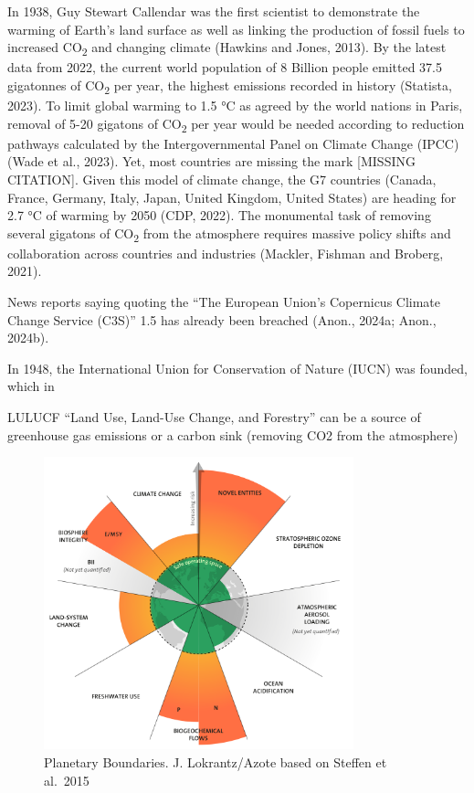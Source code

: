 \documentclass[
  letterpaper,
  DIV=11,
  numbers=noendperiod]{scrartcl}
\begin{document}
In 1938, Guy Stewart Callendar was the first scientist to demonstrate
the warming of Earth's land surface as well as linking the production of
fossil fuels to increased CO\textsubscript{2} and changing climate
(Hawkins and Jones, 2013). By the latest data from 2022, the current
world population of 8 Billion people emitted 37.5 gigatonnes of
CO\textsubscript{2} per year, the highest emissions recorded in history
(Statista, 2023). To limit global warming to 1.5 °C as agreed by the
world nations in Paris, removal of 5-20 gigatons of CO\textsubscript{2}
per year would be needed according to reduction pathways calculated by
the Intergovernmental Panel on Climate Change (IPCC) (Wade et al.,
2023). Yet, most countries are missing the mark {[}MISSING CITATION{]}.
Given this model of climate change, the G7 countries (Canada, France,
Germany, Italy, Japan, United Kingdom, United States) are heading for
2.7 °C of warming by 2050 (CDP, 2022). The monumental task of removing
several gigatons of CO\textsubscript{2} from the atmosphere requires
massive policy shifts and collaboration across countries and industries
(Mackler, Fishman and Broberg, 2021).

News reports saying quoting the ``The European Union's Copernicus
Climate Change Service (C3S)'' 1.5 has already been breached (Anon.,
2024a; Anon., 2024b).

In 1948, the International Union for Conservation of Nature (IUCN) was
founded, which in

LULUCF ``Land Use, Land-Use Change, and Forestry'' can be a source of
greenhouse gas emissions or a carbon sink (removing CO2 from the
atmosphere)

\begin{figure}[H]

{\centering \includegraphics[width=0.8\textwidth,height=\textheight]{./images/boundaries.png}

}

\caption{Planetary Boundaries. J. Lokrantz/Azote based on Steffen et
al.~2015}

\end{figure}%
\end{document}
